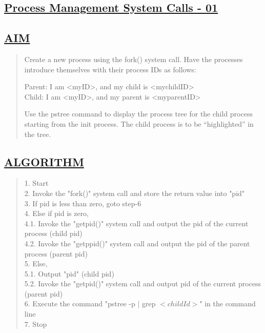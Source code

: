 \documentclass[a4paper, 12pt]{article}
\begin{document}
\newpage
\begin{center}
\section*{\LARGE \textbf{\underline{Process Management System Calls - 01}}} 
\end{center}

\subsection*{\underline{AIM}}
\begin{quote}
Create a new process using the fork() system call. Have the processes introduce themselves with their process IDs as follows:

Parent: I am \textless myID\textgreater, and my child is \textless mychildID\textgreater \\
Child: I am \textless myID\textgreater, and my parent is \textless myparentID\textgreater

Use the pstree command to display the process tree for the child process starting from the
init process. The child process is to be “highlighted” in the tree.
\end{quote}

\subsection*{\underline{ALGORITHM}}
\begin{quote}
1. Start\\
2. Invoke the "fork()" system call and store the return value into "pid"\\
3. If pid is less than zero, goto step-6\\
4. Else if pid is zero,\\
\hspace*{1cm} 4.1. Invoke the "getpid()" system call and output the pid of the current process \hspace*{2cm} (child pid)\\
\hspace*{1cm} 4.2. Invoke the "getppid()" system call and output the pid of the parent process \hspace*{2cm}  (parent pid) \\
5. Else,\\
\hspace*{1cm} 5.1. Output "pid" (child pid)\\
\hspace*{1cm} 5.2. Invoke the "getpid()" system call and output pid of the current process (parent \hspace*{2cm} pid)\\
6. Execute the command "pstree -p $|$ grep $<childId>$" in the command line\\
7. Stop\\
\end{quote}
\end{document}
